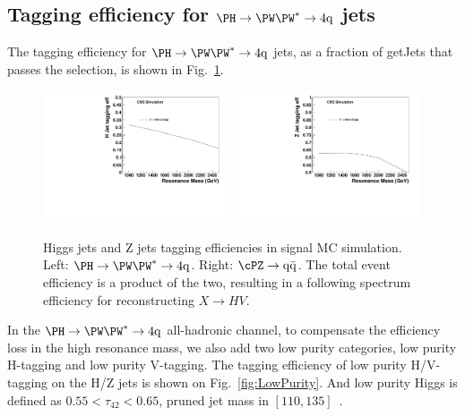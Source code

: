 
\clearpage





\subsection{Tagging efficiency for $\Hww$ jets}


The tagging efficiency for $\Hww$ jets, as a fraction of getJets that
passes the selection, is shown in Fig.~\ref{fig:HwwEff}.
\begin{figure}[htb]
\begin{center}
\includegraphics[width=0.49\textwidth]{EXO-14-009/HqqqqZqqfigs/Signal/H-taggingEff-8TeV.pdf}
\includegraphics[width=0.49\textwidth]{EXO-14-009/HqqqqZqqfigs/Signal/Z-taggingEff-8TeV.pdf}
\end{center}
\caption{
  Higgs jets and Z jets tagging efficiencies in signal MC simulation.
  Left: $\Hww$. Right: $\Zqq$.  The total event efficiency is a product
  of the two, resulting in a following spectrum efficiency for reconstructing
  $X \to HV$.
}
\label{fig:HwwEff}
\end{figure}
 

In the $\Hww$ all-hadronic channel, to compensate the efficiency loss
in the high resonance mass, we also add two low purity categories, low
purity H-tagging and low purity V-tagging.  The tagging efficiency of
low purity H/V-tagging on the H/Z jets is shown on
Fig.~\ref{fig:LowPurity}.  And low purity Higgs is defined as 
$0.55 < \tau_{42} < 0.65$, pruned jet mass in $[110, 135]$~\GeVcc.  

